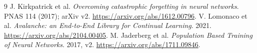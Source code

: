 \begin{thebibliography}{9}
 J. Kirkpatrick et al. \emph{Overcoming catastrophic
forgetting in neural networks}. PNAS 114 (2017); arXiv v2.
\url{https://arxiv.org/abs/1612.00796}.
 V. Lomonaco et al. \emph{Avalanche: an End-to-End
Library for Continual Learning}. 2021. \url{https://arxiv.org/abs/2104.00405}.
 M. Jaderberg et al. \emph{Population Based Training of
Neural Networks}. 2017, v2. \url{https://arxiv.org/abs/1711.09846}.
\end{thebibliography}
